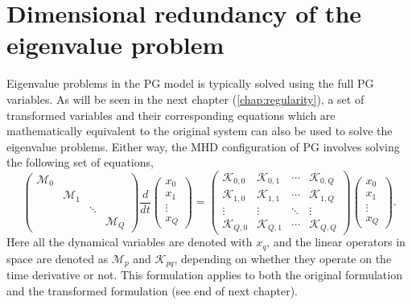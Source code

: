 \section{Dimensional redundancy of the eigenvalue problem}

Eigenvalue problems in the PG model is typically solved using the full PG variables.
As will be seen in the next chapter (\ref{chap:regularity}), a set of transformed variables and their corresponding equations which are mathematically equivalent to the original system can also be used to solve the eigenvalue problems.
Either way, the MHD configuration of PG involves solving the following set of equations,
\[
    \begin{pmatrix}
        \mathcal{M}_0 & & & \\
        & \mathcal{M}_1 & & \\
        & & \ddots & \\
        & & & \mathcal{M}_{Q}
    \end{pmatrix} \frac{d}{dt}
    \begin{pmatrix}
        x_0 \\ x_1 \\ \vdots \\ x_{Q}
    \end{pmatrix} = 
    \begin{pmatrix}
        \mathcal{K}_{0,0} & \mathcal{K}_{0,1} & \cdots & \mathcal{K}_{0,Q} \\ 
        \mathcal{K}_{1,0} & \mathcal{K}_{1,1} & \cdots & \mathcal{K}_{1,Q} \\ 
        \vdots & \vdots & \ddots & \vdots \\
        \mathcal{K}_{Q,0} & \mathcal{K}_{Q,1} & \cdots & \mathcal{K}_{Q,Q}
    \end{pmatrix}
    \begin{pmatrix}
        x_0 \\ x_1 \\ \vdots \\ x_{Q}
    \end{pmatrix}.
\]
Here all the dynamical variables are denoted with $x_q$, and the linear operators in space are denoted as $\mathcal{M}_{p}$ and $\mathcal{K}_{pq}$, depending on whether they operate on the time derivative or not.
This formulation applies to both the original formulation and the transformed formulation (see end of next chapter).

